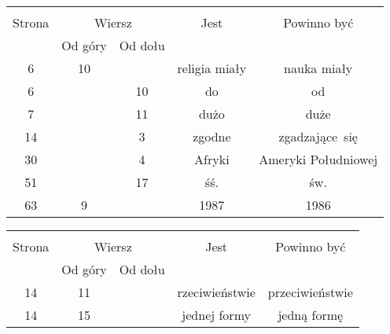 \documentclass[a4paper,11pt]{article}
\begin{document}
\begin{center}
  \begin{tabular}{|c|c|c|c|c|}
    \hline
    & \multicolumn{2}{c|}{} & & \\
    Strona & \multicolumn{2}{c|}{Wiersz} & Jest
                              & Powinno być \\ \cline{2-3}
    & Od góry & Od dołu & & \\
    \hline
    6  & 10 & & religia miały & nauka miały \\
    6  & & 10 & do & od \\
    7  & & 11 & dużo & duże \\
    14 & &  3 & zgodne & zgadzające~się \\
    30 & &  4 & Afryki & Ameryki Południowej \\
    51 & & 17 & śś. & św. \\
    63 &  9 & & 1987 & 1986 \\
    \hline
  \end{tabular}
\end{center}

\vspace{\spaceTwo}







\begin{center}
  \begin{tabular}{|c|c|c|c|c|}
    \hline
    & \multicolumn{2}{c|}{} & & \\
    Strona & \multicolumn{2}{c|}{Wiersz} & Jest
                              & Powinno być \\ \cline{2-3}
    & Od góry & Od dołu & & \\
    \hline
    14 & 11 & & rzeciwieństwie & przeciwieństwie \\
    14 & 15 & & jednej formy & jedną formę \\
    \hline
  \end{tabular}
\end{center}
\end{document}
